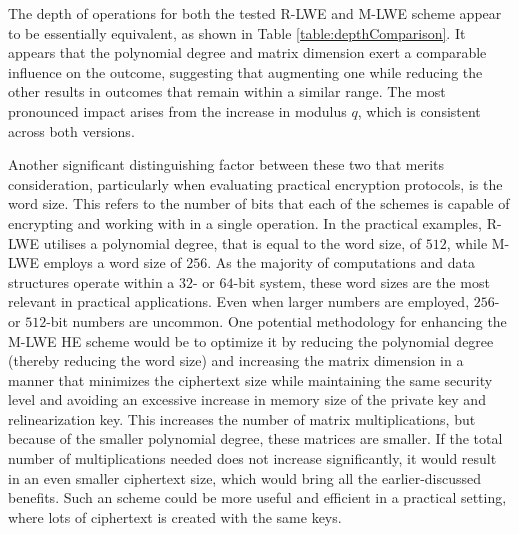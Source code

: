 The depth of operations for both the tested R-LWE and M-LWE scheme appear to be essentially equivalent, as shown in Table \ref{table:depthComparison}. It appears that the polynomial degree and matrix dimension exert a comparable influence on the outcome, suggesting that augmenting one while reducing the other results in outcomes that remain within a similar range. The most pronounced impact arises from the increase in modulus $q$, which is consistent across both versions.

Another significant distinguishing factor between these two that merits consideration, particularly when evaluating practical encryption protocols, is the word size. This refers to the number of bits that each of the schemes is capable of encrypting and working with in a single operation. In the practical examples, R-LWE utilises a polynomial degree, that is equal to the word size, of $512$, while M-LWE employs a word size of $256$. As the majority of computations and data structures operate within a $32$- or $64$-bit system, these word sizes are the most relevant in practical applications. Even when larger numbers are employed, $256$- or $512$-bit numbers are uncommon. One potential methodology for enhancing the M-LWE HE scheme would be to optimize it by reducing the polynomial degree (thereby reducing the word size) and increasing the matrix dimension in a manner that minimizes the ciphertext size while maintaining the same security level and avoiding an excessive increase in memory size of the private key and relinearization key. This increases the number of matrix multiplications, but because of the smaller polynomial degree, these matrices are smaller. If the total number of multiplications needed does not increase significantly, it would result in an even smaller ciphertext size, which would bring all the earlier-discussed benefits. Such an scheme could be more useful and efficient in a practical setting, where lots of ciphertext is created with the same keys.

